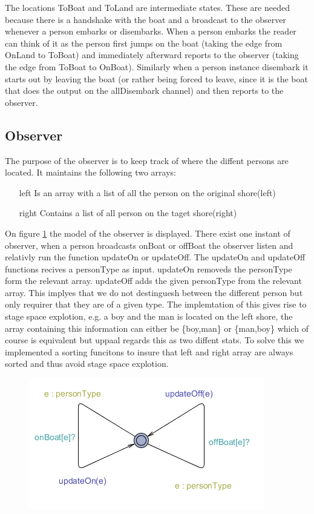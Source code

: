The locations ToBoat and ToLand are intermediate states.
These are needed because there is a handshake with the boat and a broadcast to the observer whenever a person embarks or disembarks.
When a person embarks the reader can think of it as the person first jumps on the boat (taking the edge from OnLand to ToBoat) and immediately afterward reports to the observer (taking the edge from ToBoat to OnBoat).
Similarly when a person instance disembark it starts out by leaving the boat (or rather being forced to leave, since it is the boat that does the output on the allDisembark channel) and then reports to the observer.
















\subsection{Observer}
The purpose of the observer is to keep track of where the diffent persons are located. It maintains the following two arrays:
\begin{itemize}
	\item[left] Is an array with a list of all the person on the original shore(left)
	\item[right] Contains a list of all person on the taget shore(right)
\end{itemize}

On figure \ref{fig:observer} the model of the observer is displayed. There exist one instant of observer, when a person broadcasts onBoat or offBoat the observer listen and relativly run the function updateOn or updateOff. 
The updateOn and updateOff functions recives a personType as input. updateOn removeds the personType form the relevant array. updateOff adds the given personType from the relevant array. This implyes that we do not destinguesh between the different person but only requirer that they are of a given type. The implemtation of this gives rise to stage space explotion, e.g. a boy and the man is located on the left shore, the array containing this information can either be \{boy,man\} or \{man,boy\} which of course is equivalent but uppaal regards this as two diffent stats. To solve this we implemented a sorting funcitons to insure that left and right array are always sorted and thus avoid stage space explotion.
  




\begin{figure}%
\includegraphics[width=\columnwidth]{pictures/observer.png}%
\caption{}%
\label{fig:observer}%
\end{figure}


